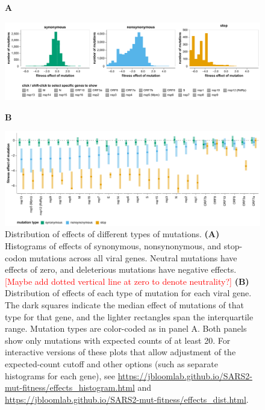 \documentclass[9pt,twocolumn,twoside]{gsajnl_modified}
\newcommand\jdbcomment[1]{\textcolor{red}{[#1]}}
\begin{document}
\begin{figure}
{\bf \Large A}

\includegraphics[width=\linewidth, trim={0in 0.7in 0 0.05in}, clip=true]{figs/effects_histogram.pdf}

{\bf \Large B}

\includegraphics[width=\linewidth, trim={0in 0.36in 0 0in}, clip=true]{figs/effects_dist.pdf}
\caption{
Distribution of effects of different types of mutations.
{\bf (A)}
Histograms of effects of synonymous, nonsynonymous, and stop-codon mutations across all viral genes.
Neutral mutations have effects of zero, and deleterious mutations have negative effects.
\jdbcomment{Maybe add dotted vertical line at zero to denote neutrality?}
{\bf (B)}
Distribution of effects of each type of mutation for each viral gene.
The dark squares indicate the median effect of mutations of that type for that gene, and the lighter rectangles span the interquartile range.
Mutation types are color-coded as in panel A.
Both panels show only mutations with expected counts of at least 20.
For interactive versions of these plots that allow adjustment of the expected-count cutoff and other options (such as separate histograms for each gene), see \url{https://jbloomlab.github.io/SARS2-mut-fitness/effects_histogram.html} and \url{https://jbloomlab.github.io/SARS2-mut-fitness/effects_dist.html}.
\label{fig:effects_dist}
}
\end{figure}
\end{document}
